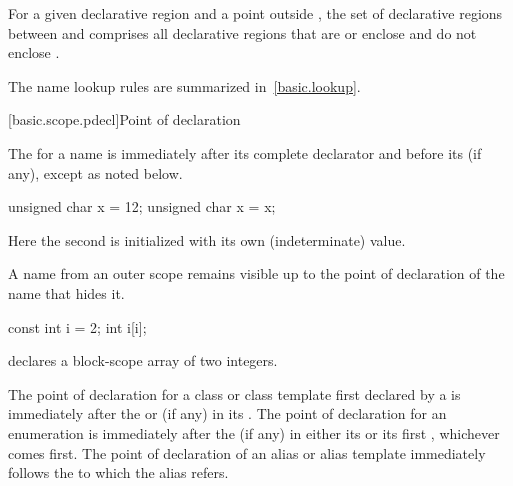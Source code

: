 \pnum
For a given declarative region 
and a point  outside ,
the set of  declarative regions
between  and 
comprises all declarative regions
that are or enclose  and do not enclose .

\pnum
\begin{note} The name lookup rules are summarized in~\ref{basic.lookup}.
\end{note}

[basic.scope.pdecl]{Point of declaration}

%

\pnum
{}%
%
The  for a name is immediately after its
complete declarator and before its
 (if any), except as noted below. \begin{example}

\begin{codeblock}
unsigned char x = 12;
{ unsigned char x = x; }
\end{codeblock}

Here the second  is initialized with its own (indeterminate)
value. \end{example}

\pnum
\begin{note}
%
A name from an outer scope remains visible up
to the point of declaration of the name that hides it. \begin{example}

\begin{codeblock}
const int  i = 2;
{ int  i[i]; }
\end{codeblock}

declares a block-scope array of two integers. \end{example} \end{note}

\pnum
The point of declaration for a class or class template first declared by a
 is immediately after the  or
 (if any) in its .
The point of declaration for an enumeration is
immediately after the  (if any) in either its
 or its first
, whichever comes first.
The point of declaration of an alias or alias template immediately
follows the  to which the
alias refers.

